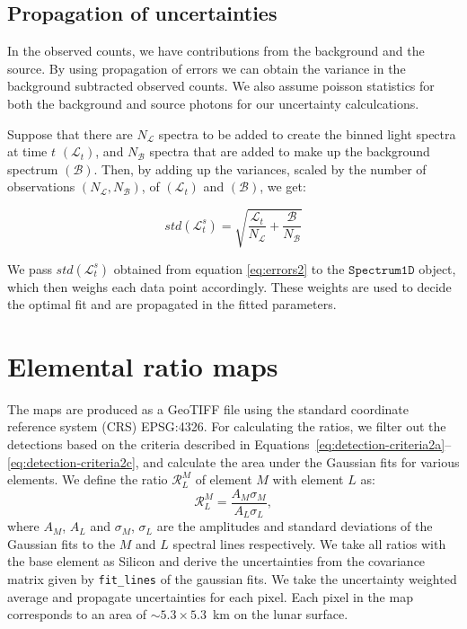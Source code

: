 \documentclass[twocolumn]{aastex631}
\begin{document}
\subsection{Propagation of uncertainties}


In the observed counts, we have contributions from the background and the source. By using propagation of errors we can obtain the variance in the background subtracted observed counts. We also assume poisson statistics for both the background and source photons for our uncertainty calculcations.



Suppose that there are $N_\mathcal{L}$ spectra to be added to create the binned light spectra at time $t$ $\left(\mathcal{L}_t\right)$, and $N_\mathcal{B}$ spectra that are added to make up the background spectrum $\left(\mathcal{B}\right)$. Then, by adding up the variances, scaled by the number of observations $\left(N_\mathcal{L},N_\mathcal{B}\right)$, of $\left(\mathcal{L}_t\right)$ and $\left(\mathcal{B}\right)$, we get:

\begin{equation}
       std(\mathcal{L}^s_t) = \sqrt{\frac{\mathcal{L}_t}{N_\mathcal{L}} + \frac{\mathcal{B}}{N_\mathcal{B}}}
    \label{eq:errors2}
\end{equation}

We pass $std(\mathcal{L}^s_t)$ obtained from equation \ref{eq:errors2} to the $\texttt{Spectrum1D}$ object, which then weighs each data point accordingly. These weights are used to decide the optimal fit and are propagated in the fitted parameters.

\section{Elemental ratio maps}\label{sec:mapping}

The maps are produced as a GeoTIFF file using the standard coordinate reference system (CRS) EPSG:4326. For calculating the ratios, we filter out the detections based on the criteria described in Equations~\ref{eq:detection-criteria2a}--\ref{eq:detection-criteria2c}, and calculate the area under the Gaussian fits for various elements. We define the ratio $\mathcal{R}^M_L$ of element $M$ with element $L$ as:
\begin{equation}
    \mathcal{R}^{M}_{L} = \dfrac{A_M \sigma_M}{A_L \sigma_L} ,
\end{equation}
where $A_M$, $A_L$ and $\sigma_M$, $\sigma_L$ are the amplitudes and standard deviations of the Gaussian fits to the $M$ and $L$ spectral lines respectively.
We take all ratios with the base element as Silicon and derive the uncertainties from the covariance matrix given by \texttt{fit\_lines} of the gaussian fits. We take the uncertainty weighted average and propagate uncertainties for each pixel. Each pixel in the map corresponds to an area of $\sim$$5.3\times 5.3$~km on the lunar surface. 
\end{document}
